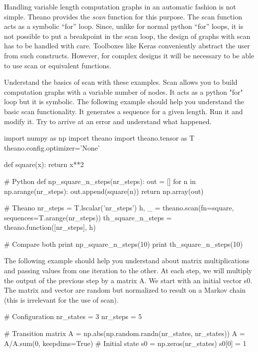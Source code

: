 Handling variable length computation graphs in an automatic fashion is not simple. 
Theano provides the \textit{scan} function for this purpose. The scan function acts
as a symbolic ``for'' loop. Since, unlike for normal python ``for'' loops, it is not
possible to put a breakpoint in the scan loop, the design of graphs
with scan has to be handled with care. Toolboxes like Keras conveniently abstract
the user from such constructs. However, for complex designs it will be
necessary to be able to use scan or equivalent functions. 

\begin{exercise}
Understand the basics of scan with these examples. Scan allows you to build
computation graphs with a variable number of nodes. It acts as a python "for"
loop but it is symbolic. The following example should help you understand the
basic scan functionality. It generates a sequence for a given length. Run it
and modify it. Try to arrive at an error and understand what happened.
\begin{python}
import numpy as np
import theano
import theano.tensor as T
theano.config.optimizer='None'

def square(x): 
    return x**2 

# Python
def np_square_n_steps(nr_steps):
    out = []
    for n in np.arange(nr_steps):
        out.append(square(n))
    return np.array(out)


\end{python}
\begin{python}
# Theano
nr_steps = T.lscalar('nr_steps')
h, _ = theano.scan(fn=square, sequences=T.arange(nr_steps))
th_square_n_steps = theano.function([nr_steps], h)

# Compare both
print np_square_n_steps(10)
print th_square_n_steps(10)
\end{python}
The following example should help you understand about matrix multiplications
and passing values from one iteration to the other. At each step, we will
multiply the output of the previous step by a matrix A. We start with an
initial vector s0. The matrix and vector are random but normalized to result on
a Markov chain (this is irrelevant for the use of scan).  
\begin{python}
# Configuration
nr_states = 3
nr_steps = 5

# Transition matrix
A = np.abs(np.random.randn(nr_states, nr_states))
A = A/A.sum(0, keepdims=True)
# Initial state
s0 = np.zeros(nr_states)
s0[0] = 1
\end{python}



\end{exercise}
